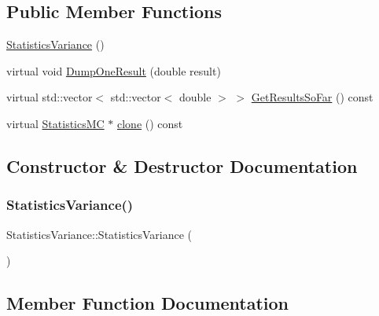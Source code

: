 \subsection*{Public Member Functions}
\begin{DoxyCompactItemize}
\item 
\hyperlink{classStatisticsVariance_ade130d1ab7fa3f8ceb0421cbb37b9808}{Statistics\+Variance} ()
\item 
virtual void \hyperlink{classStatisticsVariance_a403368dde195a18fe4ce64e41854d493}{Dump\+One\+Result} (double result)
\item 
virtual std\+::vector$<$ std\+::vector$<$ double $>$ $>$ \hyperlink{classStatisticsVariance_a755d94e3fd68419d85ab7dbffe5b7e5d}{Get\+Results\+So\+Far} () const
\item 
virtual \hyperlink{classStatisticsMC}{Statistics\+MC} $\ast$ \hyperlink{classStatisticsVariance_aed63efacc9d231e9ae00625d0c7efd81}{clone} () const
\end{DoxyCompactItemize}


\subsection{Constructor \& Destructor Documentation}
\hypertarget{classStatisticsVariance_ade130d1ab7fa3f8ceb0421cbb37b9808}{}\label{classStatisticsVariance_ade130d1ab7fa3f8ceb0421cbb37b9808} 
\subsubsection{\texorpdfstring{Statistics\+Variance()}{StatisticsVariance()}}
{\footnotesize\ttfamily Statistics\+Variance\+::\+Statistics\+Variance (\begin{DoxyParamCaption}{ }\end{DoxyParamCaption})}



\subsection{Member Function Documentation}
\hypertarget{classStatisticsVariance_aed63efacc9d231e9ae00625d0c7efd81}{}\label{classStatisticsVariance_aed63efacc9d231e9ae00625d0c7efd81} 
